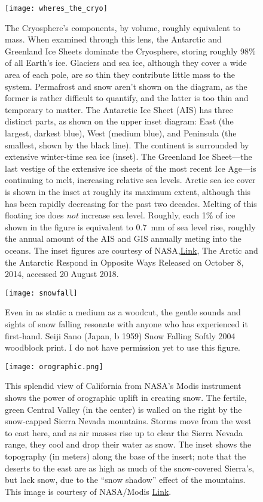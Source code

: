 \documentclass[amstex,12pt]{book}
\begin{document}
\begin{figure}[p]
	\centering
  \texttt{[image: wheres\_the\_cryo]}%
	\caption{The Cryosphere's components, by volume, roughly equivalent to mass. When examined through this lens, the Antarctic and Greenland Ice Sheets dominate the Cryosphere, storing roughly 98\% of all Earth's ice. Glaciers and sea ice, although they cover a wide area of each pole, are so thin they contribute little mass to the system. Permafrost and snow aren't shown on the diagram, as the former is rather difficult to quantify, and the latter is too thin and temporary to matter. The Antarctic Ice Sheet (AIS) has three distinct parts, as shown on the upper inset diagram: East (the largest, darkest blue), West (medium blue), and Peninsula (the smallest, shown by the black line). The continent is surrounded by extensive winter-time sea ice (inset). The Greenland Ice Sheet---the last vestige of the extensive ice sheets of the most recent Ice Age---is continuing to melt, increasing relative sea levels. Arctic sea ice cover is shown in the inset at roughly its maximum extent, although this has been rapidly decreasing for the past two decades. Melting of this floating ice does \emph{not} increase sea level. Roughly, each 1\% of ice shown in the figure is equivalent to \SI{0.7}{\milli\metre} of sea level rise, roughly the annual amount of the AIS and GIS annually meting into the oceans. The inset figures are courtesy of NASA,\href{https://svs.gsfc.nasa.gov/11703}{Link}, The Arctic and the Antarctic Respond in Opposite Ways Released on October 8, 2014, accessed 20 August 2018. }
	\label{fig:wheres_the_cryo}
\end{figure}

\begin{figure}[p]
	\centering
  \texttt{[image: snowfall]}%
	\caption{Even in as static a medium as a woodcut, the gentle sounds and sights of snow falling resonate with anyone who has experienced it first-hand. Seiji Sano (Japan, b 1959) Snow Falling Softly 2004 woodblock print. I do not have permission yet to use this figure.}
	\label{fig:snowfall}
\end{figure}

\begin{figure}[p]
	\centering
  \texttt{[image: orographic.png]}%
	\caption{This splendid view of California from NASA's Modis instrument shows the power of orographic uplift in creating snow. The fertile, green Central Valley (in the center) is walled on the right by the snow-capped Sierra Nevada mountains. Storms move from the west to east here, and as air masses rise up to clear the Sierra Nevada range, they cool and drop their water as snow. The inset shows the topography (in meters) along the base of the insert; note that the deserts to the east are as high as much of the snow-covered Sierra's, but lack snow, due to the ``snow shadow'' effect of the mountains. This image is courtesy of NASA/Modis \href{https://www.ncdc.noaa.gov/sites/default/files/Sierra-Nevada-snowpack-comparison-web-quality.jpg}{Link}.  }
	\label{fig:orographic}
\end{figure}
\end{document}

